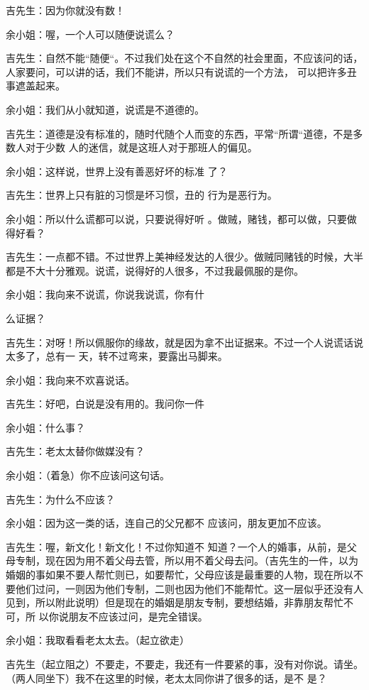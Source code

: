 \documentclass{article}
\begin{document}
吉先生：因为你就没有数！ 


余小姐：喔，一个人可以随便说谎么？ 

吉先生：自然不能“随便“。不过我们处在这个不自然的社会里面，不应该问的话，人家要问，可以讲的话，我们不能讲，所以只有说谎的一个方法，
可以把许多丑事遮盖起来。 

\newpage

余小姐：我们从小就知道，说谎是不道德的。

吉先生：道德是没有标准的，随时代随个人而变的东西，平常“所谓“道德，不是多数人对于少数
人的迷信，就是这班人对于那班人的偏见。 

余小姐：这样说，世界上没有善恶好坏的标准
了？ 

吉先生：世界上只有脏的习惯是坏习惯，丑的
行为是恶行为。 

余小姐：所以什么谎都可以说，只要说得好听
。做贼，赌钱，都可以做，只要做得好看？ 

吉先生：一点都不错。不过世界上美神经发达的人很少。做贼同赌钱的时候，大半都是不大十分雅观。说谎，说得好的人很多，不过我最佩服的是你。

余小姐：我向来不说谎，你说我说谎，你有什

\newpage
么证据？ 

吉先生：对呀！所以佩服你的缘故，就是因为拿不出证据来。不过一个人说谎话说太多了，总有一
天，转不过弯来，要露出马脚来。 


余小姐：我向来不欢喜说话。 

吉先生：好吧，白说是没有用的。我问你一件


余小姐：什么事？ 


吉先生：老太太替你做媒没有？ 


余小姐：（着急）你不应该问这句话。 


吉先生：为什么不应该？ 

余小姐：因为这一类的话，连自己的父兄都不
应该问，朋友更加不应该。 

吉先生：喔，新文化！新文化！不过你知道不
\newpage
知道？一个人的婚事，从前，是父母专制，现在因为用不着父母去管，所以用不着父母去问。（吉先生的一件，以为婚姻的事如果不要人帮忙则已，如要帮忙，父母应该是最重要的人物，现在所以不要他们过问，一则因为他们专制，二则也因为他们不能帮忙。这一层似乎还没有人见到，所以附此说明）但是现在的婚姻是朋友专制，要想结婚，非靠朋友帮忙不可，所
以你说朋友不应该过问，是完全错误。 


余小姐：我取看看老太太去。（起立欲走） 

吉先生（起立阻之）不要走，不要走，我还有一件要紧的事，没有对你说。请坐。（两人同坐下）我不在这里的时候，老太太同你讲了很多的话，是不
是？ 
\end{document}
